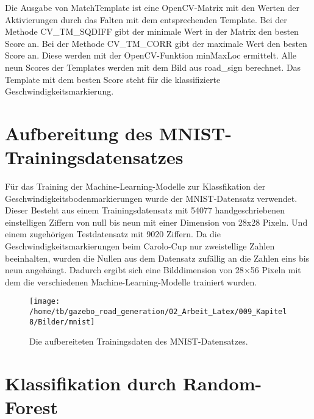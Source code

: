 Die Ausgabe von MatchTemplate ist eine OpenCV-Matrix mit den Werten der Aktivierungen durch das Falten mit dem entsprechenden Template.
Bei der Methode CV\_TM\_SQDIFF gibt der minimale Wert in der Matrix den besten Score an. Bei der Methode CV\_TM\_CORR gibt der maximale Wert den besten Score an. Diese werden mit der OpenCV-Funktion minMaxLoc ermittelt.
Alle neun Scores der Templates werden mit dem Bild aus road\_sign berechnet.
Das Template mit dem besten Score steht f{\"u}r die klassifizierte Geschwindigkeitsmarkierung. 

\newpage

\section{Aufbereitung des MNIST-Trainingsdatensatzes}
\label{sec:Aufbereitung des MNIST-Trainingsdatensatzes}

F{\"u}r das Training der Machine-Learning-Modelle zur Klassfikation der Geschwindigkeitsbodenmarkierungen wurde der MNIST-Datensatz verwendet.
Dieser Besteht aus einem Trainingsdatensatz mit 54077 handgeschriebenen einstelligen Ziffern von null bis neun mit einer Dimension von 28x28 Pixeln. Und einem zugeh{\"o}rigen Testdatensatz mit 9020 Ziffern.
Da die Geschwindigkeitsmarkierungen beim Carolo-Cup nur zweistellige Zahlen beeinhalten, wurden die Nullen aus dem Datensatz zuf{\"a}llig an die Zahlen eins bis neun angeh{\"a}ngt. Dadurch ergibt sich eine Bilddimension von 28$\times$56 Pixeln mit dem die verschiedenen Machine-Learning-Modelle trainiert wurden.

\begin{figure}[H]
\begin{center}
  \texttt{[image: /home/tb/gazebo\_road\_generation/02\_Arbeit\_Latex/009\_Kapitel8/Bilder/mnist]}%
  \caption[Die aufbereiteten Trainingsdaten des MNIST-Datensatzes]%
           {\label{fig:Aufbereitete Features des MNIST-Datensatzes}%
           Die aufbereiteten Trainingsdaten des MNIST-Datensatzes.
           }
\end{center}
\end{figure}

\section{Klassifikation durch Random-Forest}
\label{sec:Klassifikation durch Random-Forest}

